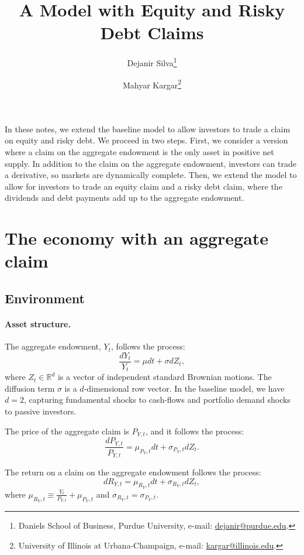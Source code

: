 \documentclass[11pt,english]{article}
\title{\textbf{A Model with Equity and Risky Debt Claims}}
\author{ Dejanir Silva\thanks{Daniels School of Business, Purdue University, e-mail: \href{dejanir@purdue.edu}{dejanir@purdue.edu}.} \and Mahyar Kargar\thanks{University of Illinois at Urbana-Champaign, e-mail: \href{mailto:kargar@illinois.edu}{kargar@illinois.edu}.}}
\begin{document}
	\sloppy
	\maketitle
	\thispagestyle{empty}
	
\doublespacing

In these notes, we extend the baseline model to allow investors to trade a claim on equity and risky debt. 
We proceed in two steps. 
First, we consider a version where a claim on the aggregate endowment is the only asset in positive net supply. 
In addition to the claim on the aggregate endowment, investors can trade a derivative, so markets are dynamically complete. 
Then, we extend the model to allow for investors to trade an equity claim and a risky debt claim, where the dividends and debt payments add up to the aggregate endowment.


\section{The economy with an aggregate claim}

\subsection{Environment}

\paragraph{Asset structure.}
The aggregate endowment, $Y_t$, follows the process:
\begin{equation}
    \frac{d Y_t}{Y_t} = \mu dt + \sigma d Z_t,
\end{equation}
where $Z_t \in \mathbb{R}^d$ is a vector of independent standard Brownian motions. 
The diffusion term $\sigma$ is a $d$-dimensional row vector. 
In the baseline model, we have $d = 2$, capturing fundamental shocks to cash-flows and portfolio demand shocks to passive investors. 

The price of the aggregate claim is $P_{Y,t}$, and it follows the process:
\begin{equation}
    \frac{d P_{Y,t}}{P_{Y,t}} = \mu_{P_Y,t} dt + \sigma_{P_Y,t} d Z_t.
\end{equation}

The return on a claim on the aggregate endowment follows the process:
\begin{equation}
    d R_{Y,t} = \mu_{R_Y,t} dt + \sigma_{R_Y,t} d Z_t,
\end{equation}
where $\mu_{R_Y,t} \equiv \frac{Y_t}{P_{Y,t}} + \mu_{P_Y,t}$ and $\sigma_{R_Y,t} = \sigma_{P_Y,t}$.
\end{document}
